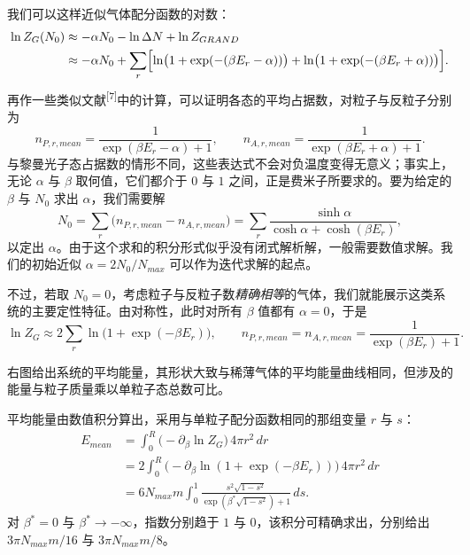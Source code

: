 我们可以这样近似气体配分函数的对数：
\begin{align}
\ln Z_{G}(N_{0})
&\approx-\alpha N_{0}-\ln\Delta N+\ln Z_{GRAND} \nonumber\\
&\approx-\alpha N_{0}+\sum_{r}\Bigl[
\ln\bigl(1+\exp(-(\beta E_{r}-\alpha))\bigr)
+\ln\bigl(1+\exp(-(\beta E_{r}+\alpha))\bigr)\Bigr].
\end{align}
再作一些类似文献\textsuperscript{[7]}中的计算，可以证明各态的平均占据数，对粒子与反粒子分别为
\begin{equation}
n_{P,r,mean}=\frac{1}{\exp(\beta E_{r}-\alpha)+1},
\qquad
n_{A,r,mean}=\frac{1}{\exp(\beta E_{r}+\alpha)+1}.
\end{equation}
与黎曼光子态占据数的情形不同，这些表达式不会对负温度变得无意义；事实上，无论 $\alpha$ 与 $\beta$ 取何值，它们都介于 $0$ 与 $1$ 之间，正是费米子所要求的。要为给定的 $\beta$ 与 $N_{0}$ 求出 $\alpha$，我们需要解
\begin{equation}
N_{0}=\sum_{r}\bigl(n_{P,r,mean}-n_{A,r,mean}\bigr)
=\sum_{r}\frac{\sinh\alpha}{\cosh\alpha+\cosh(\beta E_{r})},
\end{equation}
以定出 $\alpha$。由于这个求和的积分形式似乎没有闭式解析解，一般需要数值求解。我们的初始近似 $\alpha=2N_{0}/N_{max}$ 可以作为迭代求解的起点。

不过，若取 $N_{0}=0$，考虑粒子与反粒子数\emph{精确相等}的气体，我们就能展示这类系统的主要定性特征。由对称性，此时对所有 $\beta$ 值都有 $\alpha=0$，于是
\begin{equation}
\ln Z_{G}\approx 2\sum_{r}\ln\bigl(1+\exp(-\beta E_{r})\bigr),
\qquad
n_{P,r,mean}=n_{A,r,mean}=\frac{1}{\exp(\beta E_{r})+1}.
\end{equation}


右图给出系统的平均能量，其形状大致与稀薄气体的平均能量曲线相同，但涉及的能量与粒子质量乘以单粒子态总数可比。

平均能量由数值积分算出，采用与单粒子配分函数相同的那组变量 $r$ 与 $s$：
\begin{align}
E_{mean}
&=\int_{0}^{R}\bigl(-\partial_{\beta}\ln Z_{G}\bigr)\,4\pi r^{2}\,dr \nonumber\\
&=2\int_{0}^{R}\bigl(-\partial_{\beta}\ln(1+\exp(-\beta E_{r}))\bigr)\,4\pi r^{2}\,dr \nonumber\\
&=6N_{max}m\int_{0}^{1}
\frac{s^{2}\sqrt{1-s^{2}}}{\exp(\beta^{*}\sqrt{1-s^{2}})+1}\,ds .
\end{align}
对 $\beta^{*}=0$ 与 $\beta^{*}\to-\infty$，指数分别趋于 $1$ 与 $0$，该积分可精确求出，分别给出 $3\pi N_{max}m/16$ 与 $3\pi N_{max}m/8$。

